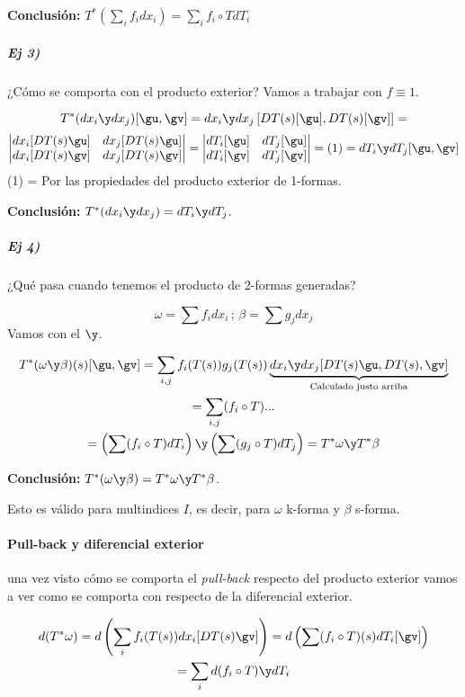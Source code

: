 \textbf{Conclusión: } $T^{\ast} (\sum_i f_idx_i) = \sum_i f_i \circ T dT_i$

\subparagraph{Ej 3)} ¿Cómo se comporta con el producto exterior? Vamos a trabajar con $f\equiv 1$.

\[
T^{\ast}(dx_i\y dx_j) [\gu,\gv] = dx_i\y dx_j \left[DT(s)[\gu], DT(s)[\gv]\right] =\]\[ \left|\begin{matrix}
dx_i[DT(s)\gu] & dx_j[DT(s)\gu] \\
dx_i[DT(s)\gv] & dx_j[DT(s)\gv] 
\end{matrix}\right| = \left| \begin{matrix}
dT_i[\gu] & dT_j[\gu]\\
dT_i[\gv] & dT_j[\gv]
\end{matrix}\right| = (1) = dT_i \y dT_j [\gu,\gv]
\]
(1) = Por las propiedades del producto exterior de 1-formas.

\textbf{Conclusión: } $T^{\ast} (dx_i \y dx_j) = dT_i \y dT_j$.

\subparagraph{Ej 4)} ¿Qué pasa cuando tenemos el producto de 2-formas generadas?

\[\omega = \sum f_idx_i\,;\,\beta=\sum g_jdx_j\]
Vamos con el $\y$.

\begin{gather*}
T^{\ast} (\omega \y \beta) (s) [\gu,\gv] = \sum_{i,j} f_i(T(s))g_j(T(s)) \underbrace{dx_i\y dx_j [DT(s)\gu, DT(s),\gv]}_{\text{Calculado justo arriba}}\\
= \sum_{i,j} (f_i\circ T) ... \\
= \left(\sum (f_i\circ T)dT_i\right)\y\left(\sum(g_j \circ T) dT_j\right) = T^{\ast}\omega \y T^{\ast}\beta
\end{gather*}

\textbf{Conclusión: } $T^{\ast}(\omega \y \beta) = T^{\ast}\omega \y T^{\ast}\beta$. 

Esto es válido para multindices $I$, es decir, para $\omega$ k-forma y $\beta$ s-forma.


\paragraph{Pull-back y diferencial exterior}
una vez visto cómo se comporta el \emph{pull-back} respecto del producto exterior vamos a ver como se comporta con respecto de la diferencial exterior.

\begin{gather*}
d(T^{\ast} \omega) = d\left(\sum_i f_i(T(s)) dx_i [DT(s)\gv]\right) = d\left(\sum (f_i \circ T)(s) dT_i[\gv]\right)\\
= \sum_i d(f_i\circ T)\y dT_i
\end{gather*}

